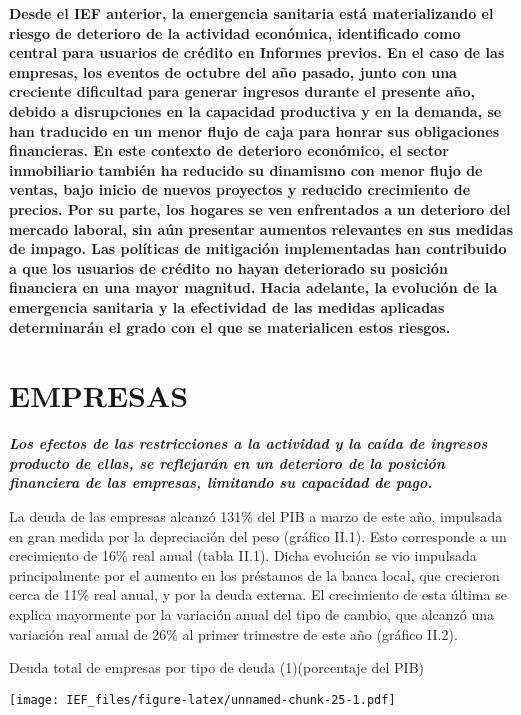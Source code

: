 \documentclass[
]{book}
\begin{document}
\textbf{Desde el IEF anterior, la emergencia sanitaria está materializando el riesgo de
deterioro de la actividad económica, identificado como central para usuarios de
crédito en Informes previos. En el caso de las empresas, los eventos de octubre
del año pasado, junto con una creciente dificultad para generar ingresos
durante el presente año, debido a disrupciones en la capacidad productiva y
en la demanda, se han traducido en un menor flujo de caja para honrar sus
obligaciones financieras. En este contexto de deterioro económico, el sector
inmobiliario también ha reducido su dinamismo con menor flujo de ventas,
bajo inicio de nuevos proyectos y reducido crecimiento de precios. Por su
parte, los hogares se ven enfrentados a un deterioro del mercado laboral, sin
aún presentar aumentos relevantes en sus medidas de impago. Las políticas
de mitigación implementadas han contribuido a que los usuarios de crédito
no hayan deteriorado su posición financiera en una mayor magnitud. Hacia
adelante, la evolución de la emergencia sanitaria y la efectividad de las medidas
aplicadas determinarán el grado con el que se materialicen estos riesgos.}

\hypertarget{EM}{%
\section*{EMPRESAS}\label{EM}}

\textbf{\emph{Los efectos de las restricciones a la actividad y la caída de ingresos
producto de ellas, se reflejarán en un deterioro de la posición
financiera de las empresas, limitando su capacidad de pago.}}

La deuda de las empresas alcanzó 131\% del PIB a marzo de este año, impulsada
en gran medida por la depreciación del peso (gráfico II.1). Esto corresponde a
un crecimiento de 16\% real anual (tabla II.1). Dicha evolución se vio impulsada
principalmente por el aumento en los préstamos de la banca local, que crecieron
cerca de 11\% real anual, y por la deuda externa. El crecimiento de esta última
se explica mayormente por la variación anual del tipo de cambio, que alcanzó
una variación real anual de 26\% al primer trimestre de este año (gráfico II.2).

Deuda total de empresas por tipo de deuda (1)(porcentaje del PIB)

\texttt{[image: IEF\_files/figure-latex/unnamed-chunk-25-1.pdf]}
\end{document}
